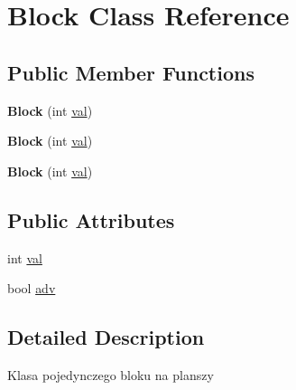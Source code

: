 \hypertarget{classBlock}{\section{Block Class Reference}
\label{classBlock}
}
\subsection*{Public Member Functions}
\begin{DoxyCompactItemize}
\item 
\hypertarget{classBlock_a011e16727c6af0e3ffdb5bedaee4550e}{{\bfseries Block} (int \hyperlink{classBlock_aa7f0cc1c0ca66b1d5655487ebabacb6b}{val})}\label{classBlock_a011e16727c6af0e3ffdb5bedaee4550e}

\item 
\hypertarget{classBlock_a011e16727c6af0e3ffdb5bedaee4550e}{{\bfseries Block} (int \hyperlink{classBlock_aa7f0cc1c0ca66b1d5655487ebabacb6b}{val})}\label{classBlock_a011e16727c6af0e3ffdb5bedaee4550e}

\item 
\hypertarget{classBlock_a011e16727c6af0e3ffdb5bedaee4550e}{{\bfseries Block} (int \hyperlink{classBlock_aa7f0cc1c0ca66b1d5655487ebabacb6b}{val})}\label{classBlock_a011e16727c6af0e3ffdb5bedaee4550e}

\end{DoxyCompactItemize}
\subsection*{Public Attributes}
\begin{DoxyCompactItemize}
\item 
int \hyperlink{classBlock_aa7f0cc1c0ca66b1d5655487ebabacb6b}{val}
\item 
bool \hyperlink{classBlock_aa5b4442c70728ea6f44b23f781bd7fec}{adv}
\end{DoxyCompactItemize}


\subsection{Detailed Description}
Klasa pojedynczego bloku na planszy 

